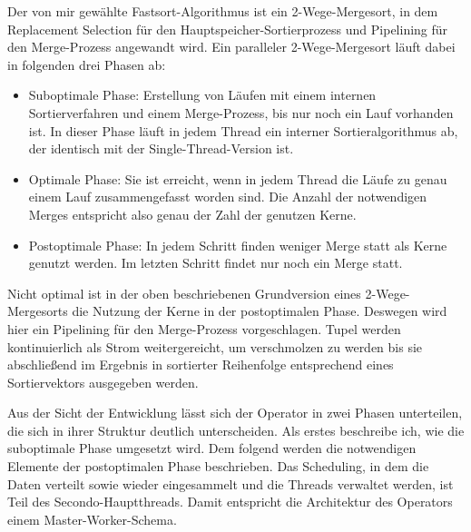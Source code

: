 \documentclass[a4paper,12pt,twoside]{article}
\begin{document}
Der von mir gewählte Fastsort-Algorithmus ist ein 2-Wege-Mergesort, in dem Replacement Selection für den Hauptspeicher-Sortierprozess und Pipelining für den Merge-Prozess angewandt wird. Ein paralleler 2-Wege-Mergesort läuft dabei in folgenden drei Phasen ab:

\begin{itemize}
	\item Suboptimale Phase: Erstellung von Läufen mit einem internen Sortierverfahren und einem Merge-Prozess, bis nur noch ein Lauf vorhanden ist. In dieser Phase läuft in jedem Thread ein interner Sortieralgorithmus ab, der identisch mit der Single-Thread-Version ist.
	\item Optimale Phase: Sie ist erreicht, wenn in jedem Thread die Läufe zu genau einem Lauf zusammengefasst worden sind. Die Anzahl der notwendigen Merges entspricht also genau der Zahl der genutzen Kerne. 
	\item Postoptimale Phase: In jedem Schritt finden weniger Merge statt als Kerne genutzt werden. Im letzten Schritt findet nur noch ein Merge statt.
\end{itemize}

Nicht optimal ist in der oben beschriebenen Grundversion eines 2-Wege-Mergesorts die Nutzung der Kerne in der postoptimalen Phase. Deswegen wird hier ein Pipelining für den Merge-Prozess vorgeschlagen. Tupel werden kontinuierlich als Strom weitergereicht, um verschmolzen zu werden bis sie abschließend im Ergebnis in sortierter Reihenfolge entsprechend eines Sortiervektors ausgegeben werden. 

Aus der Sicht der Entwicklung lässt sich der Operator in zwei Phasen unterteilen, die sich in ihrer Struktur deutlich unterscheiden. Als erstes beschreibe ich, wie die suboptimale Phase umgesetzt wird. Dem folgend werden die notwendigen Elemente der postoptimalen Phase beschrieben. Das Scheduling, in dem die Daten verteilt sowie wieder eingesammelt und die Threads verwaltet werden, ist Teil des Secondo-Hauptthreads. Damit entspricht die Architektur des Operators einem Master-Worker-Schema.
\end{document}
